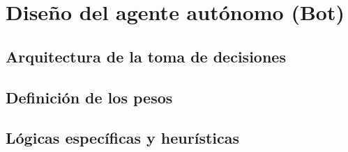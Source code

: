 \chapter{Diseño del agente autónomo (Bot)}

\section{Arquitectura de la toma de decisiones}

\section{Definición de los pesos}

\section{Lógicas específicas y heurísticas}
